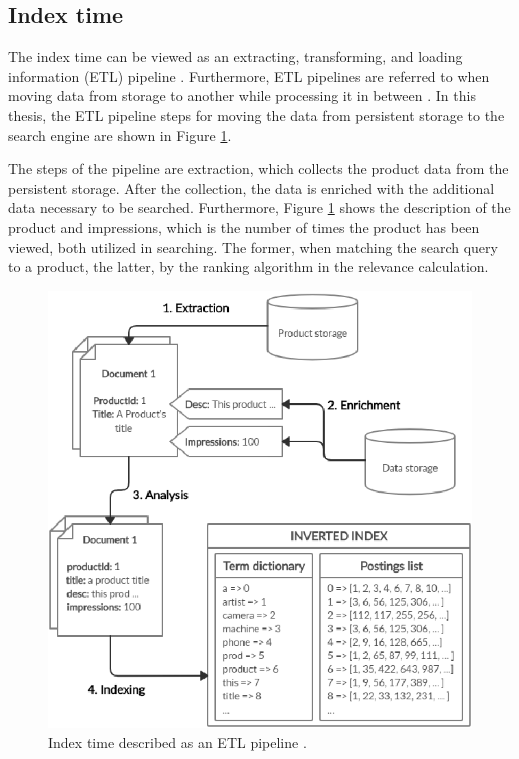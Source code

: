 \subsection{Index time}
\label{ss:indexTime}

The index time can be viewed as an extracting, transforming, and loading information (ETL) pipeline \cite{relevantSearch}.
Furthermore, ETL pipelines are referred to when moving data from storage to another while processing it in between \cite{relevantSearch}.
In this thesis, the ETL pipeline steps for moving the data from persistent storage to the search engine are shown in Figure \ref{fig:etlPipe}.

The steps of the pipeline are extraction, which collects the product data from the persistent storage.
After the collection, the data is enriched with the additional data necessary to be searched.
Furthermore, Figure \ref{fig:etlPipe} shows the description of the product and impressions, which is the number of times the product has been viewed, both utilized in searching. 
The former, when matching the search query to a product, the latter, by the ranking algorithm in the relevance calculation.


\begin{figure}
    \centering
    \includegraphics[scale=1.5]{img/etl-pipeline.eps}
    \caption{Index time described as an ETL pipeline \cite{relevantSearch}.}
    \label{fig:etlPipe}
\end{figure}


